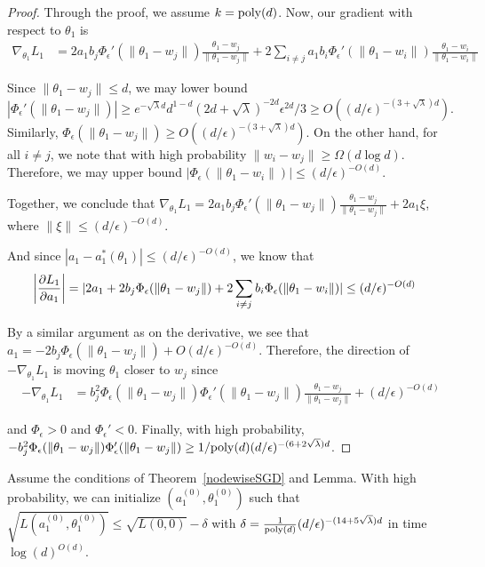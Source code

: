 \begin{proof}
Through the proof, we assume $k = \mathrm{poly}(d)$. Now, our gradient with respect to $\theta_1$ is
%
\begin{align*}
\nabla_{\theta_1} L_1 &= 2a_1b_j \Phi_\epsilon'(\|\theta_1 - w_j\|) \frac{\theta_1 - w_j}{\|\theta_1 - w_j\|}+ 2\sum_{i\neq j} a_1b_i\Phi_\epsilon'(\|\theta_1 - w_i\|) \frac{\theta_1 - w_i}{\|\theta_1 - w_i\|}
\end{align*}
%

Since $\|\theta_1 - w_j\| \leq d$, we may lower bound $|\Phi_\epsilon'(\|\theta_1 - w_j\|)| \geq e^{-\sqrt{\lambda}d}d^{1-d}(2d+\sqrt{\lambda})^{-2d}\epsilon^{2d}/3 \geq O((d/\epsilon)^{-(3+\sqrt{\lambda})d})$. Similarly, $\Phi_\epsilon(\|\theta_1 - w_j\|) \geq O((d/\epsilon)^{-(3+\sqrt{\lambda})d})$. On the other hand, for all $i \neq j$, we note that with high probability $\|w_i - w_j\| \geq \Omega(d \log d)$. Therefore, we may upper bound $|\Phi_{\epsilon}(\|\theta_1 - w_i\|)| \leq (d/\epsilon)^{-O(d)}$. 

Together, we conclude that $\nabla_{\theta_1} L_1 = 2a_1b_j \Phi_\epsilon'(\|\theta_1 - w_j\|) \frac{\theta_1 - w_j}{\|\theta_1 - w_j\|} + 2a_1\xi$, where $\|\xi\| \leq (d/\epsilon)^{-O(d)}$.

And since $|a_1 - a_1^*(\theta_1)| \leq (d/\epsilon)^{-O(d)}$, we know that
%
\begin{align*}
   \left| \frac{\partial L_1}{\partial a_1} \right| & = \lvert 2a_1 + 2b_j \Phi_\epsilon(\|\theta_1 - w_j\|) + 2\sum_{i \neq j} b_i \Phi_\epsilon(\|\theta_1 - w_i\|) \rvert \leq (d/\epsilon)^{-O(d)}
\end{align*}

By a similar argument as on the derivative, we see that $a_1 = -2b_j \Phi_\epsilon(\|\theta_1 - w_j\|) + O(d/\epsilon)^{-O(d)}$. Therefore, the direction of $-\nabla_{\theta_1} L_1$ is moving $\theta_1$ closer to $w_j$ since 
%
\begin{align*}
-\nabla_{\theta_1} L_1 &=  b_j^2\Phi_\epsilon(\|\theta_1-w_j\|)\Phi_\epsilon'(\|\theta_1 - w_j\|) \frac{\theta_1 - w_j}{\|\theta_1 - w_j\|} + (d/\epsilon)^{-O(d)} 
\end{align*}

and $\Phi_\epsilon > 0$ and $\Phi_\epsilon' < 0$. Finally, with high probability, $-b_j^2\Phi_\epsilon(\|\theta_1-w_j\|)\Phi_\epsilon'(\|\theta_1 - w_j\|) \geq 1/\mathrm{poly}(d)(d/\epsilon)^{-(6+2\sqrt{\lambda})d}$.
\end{proof}

 
 \begin{lemma}[Initialization]\label{nodeInitialize}
Assume the conditions of Theorem~\ref{nodewiseSGD} and Lemma. With high probability, we can initialize $(a_1^{(0)},\theta_1^{(0)})$ such that $\sqrt{L(a_1^{(0)},\theta_1^{(0)})} \leq \sqrt{L({0,0})} -\delta$ with $\delta = \frac{1}{\mathrm{poly}(d)}(d/\epsilon)^{ -(14+5\sqrt{\lambda})d}$ in time $\log(d)^{O(d)}$.
 \end{lemma}

